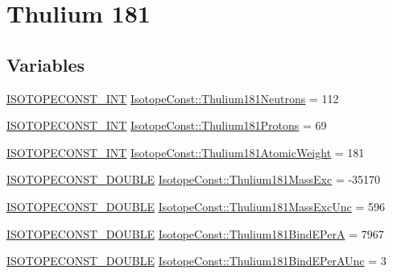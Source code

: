 \hypertarget{group___isotope_const-_thulium-_tm181}{}\section{Thulium 181}
\label{group___isotope_const-_thulium-_tm181}
\subsection*{Variables}
\begin{DoxyCompactItemize}
\item 
\mbox{\hyperlink{group___isotope_const-_macros_ga5f18360b3e99483a35c32d789e62621c}{I\+S\+O\+T\+O\+P\+E\+C\+O\+N\+S\+T\+\_\+\+I\+NT}} \mbox{\hyperlink{group___isotope_const-_thulium-_tm181_ga1c250dbebfc0d5f674452a96fc031e60}{Isotope\+Const\+::\+Thulium181\+Neutrons}} = 112
\item 
\mbox{\hyperlink{group___isotope_const-_macros_ga5f18360b3e99483a35c32d789e62621c}{I\+S\+O\+T\+O\+P\+E\+C\+O\+N\+S\+T\+\_\+\+I\+NT}} \mbox{\hyperlink{group___isotope_const-_thulium-_tm181_gac4d85895cf27380f21f9a5159d7ae523}{Isotope\+Const\+::\+Thulium181\+Protons}} = 69
\item 
\mbox{\hyperlink{group___isotope_const-_macros_ga5f18360b3e99483a35c32d789e62621c}{I\+S\+O\+T\+O\+P\+E\+C\+O\+N\+S\+T\+\_\+\+I\+NT}} \mbox{\hyperlink{group___isotope_const-_thulium-_tm181_gadfd812a78c22c8ffd0610e70acfb2f84}{Isotope\+Const\+::\+Thulium181\+Atomic\+Weight}} = 181
\item 
\mbox{\hyperlink{group___isotope_const-_macros_ga8f45a7272ce02c0b4c65c44636ed719a}{I\+S\+O\+T\+O\+P\+E\+C\+O\+N\+S\+T\+\_\+\+D\+O\+U\+B\+LE}} \mbox{\hyperlink{group___isotope_const-_thulium-_tm181_ga2d29754fc2477b998207cdff624e61d4}{Isotope\+Const\+::\+Thulium181\+Mass\+Exc}} = -\/35170
\item 
\mbox{\hyperlink{group___isotope_const-_macros_ga8f45a7272ce02c0b4c65c44636ed719a}{I\+S\+O\+T\+O\+P\+E\+C\+O\+N\+S\+T\+\_\+\+D\+O\+U\+B\+LE}} \mbox{\hyperlink{group___isotope_const-_thulium-_tm181_ga5dae6e8e45787efa80e952faa5db47ff}{Isotope\+Const\+::\+Thulium181\+Mass\+Exc\+Unc}} = 596
\item 
\mbox{\hyperlink{group___isotope_const-_macros_ga8f45a7272ce02c0b4c65c44636ed719a}{I\+S\+O\+T\+O\+P\+E\+C\+O\+N\+S\+T\+\_\+\+D\+O\+U\+B\+LE}} \mbox{\hyperlink{group___isotope_const-_thulium-_tm181_ga2b4496f17bcf6f394db40625467d5e71}{Isotope\+Const\+::\+Thulium181\+Bind\+E\+PerA}} = 7967
\item 
\mbox{\hyperlink{group___isotope_const-_macros_ga8f45a7272ce02c0b4c65c44636ed719a}{I\+S\+O\+T\+O\+P\+E\+C\+O\+N\+S\+T\+\_\+\+D\+O\+U\+B\+LE}} \mbox{\hyperlink{group___isotope_const-_thulium-_tm181_ga9d9387a9e89137aecd388fc4ff100eac}{Isotope\+Const\+::\+Thulium181\+Bind\+E\+Per\+A\+Unc}} = 3

\end{DoxyCompactItemize}
